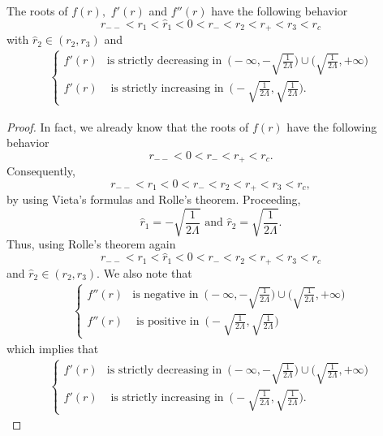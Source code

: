 \documentclass[10pt,a4paper]{amsart}
\begin{document}
\begin{lemma}\label{lemma}
The roots of $f(r),$ $f'(r)$ and $f''(r)$ have the following behavior
$$r_{--}<r_1<\hat{r}_1<0<r_{-}<r_2<r_{+}<r_3<r_{c}$$
with $\hat{r}_2\in (r_2,r_3)$ and
\begin{eqnarray*}
\left\{\begin{array}{rc}
f'(r) &\mbox{is strictly decreasing in}\,\,\, \Big(-\infty,-\sqrt{\frac{1}{2\Lambda}}\Big)\cup\Big(\sqrt{\frac{1}{2\Lambda}},+\infty\Big)\\
f'(r)  &\mbox{ is strictly increasing in}\,\,\, \Big(-\sqrt{\frac{1}{2\Lambda}},\sqrt{\frac{1}{2\Lambda}}\Big).
\end{array}\right.
\end{eqnarray*}
\end{lemma}

\begin{proof}
   In fact, we already know that the roots of $f(r)$ have the following behavior
$$r_{--}<0<r_{-}<r_{+}<r_{c}.$$
Consequently,
 $$r_{--}<r_1<0<r_{-}<r_2<r_{+}<r_3<r_c,$$
 by using Vieta's formulas and Rolle's theorem.
 Proceeding, 
$$\hat{r}_1=-\sqrt{\frac{1}{2\Lambda}}\,\,\mbox{and}\,\,\hat{r}_2=\sqrt{\frac{1}{2\Lambda}}.$$
 Thus, using Rolle's theorem again
 $$r_{--}<r_1<\hat{r}_1<0<r_{-}<r_2<r_{+}<r_3<r_c$$
and $\hat{r}_2\in (r_2,r_3).$ We also note that
\begin{eqnarray*}
\left\{\begin{array}{rc}
f''(r) &\mbox{is negative in}\,\,\, \Big(-\infty,-\sqrt{\frac{1}{2\Lambda}}\Big)\cup\Big(\sqrt{\frac{1}{2\Lambda}},+\infty\Big)\\
f''(r)  &\mbox{ is positive in}\,\,\, \Big(-\sqrt{\frac{1}{2\Lambda}},\sqrt{\frac{1}{2\Lambda}}\Big)
\end{array}\right.
\end{eqnarray*} 
which implies that
\begin{eqnarray*}
\left\{\begin{array}{rc}
f'(r) &\mbox{is strictly decreasing in}\,\,\, \Big(-\infty,-\sqrt{\frac{1}{2\Lambda}}\Big)\cup\Big(\sqrt{\frac{1}{2\Lambda}},+\infty\Big)\\
f'(r)  &\mbox{ is strictly increasing in}\,\,\, \Big(-\sqrt{\frac{1}{2\Lambda}},\sqrt{\frac{1}{2\Lambda}}\Big).
\end{array}\right.
\end{eqnarray*} 
\end{proof}
\end{document}
